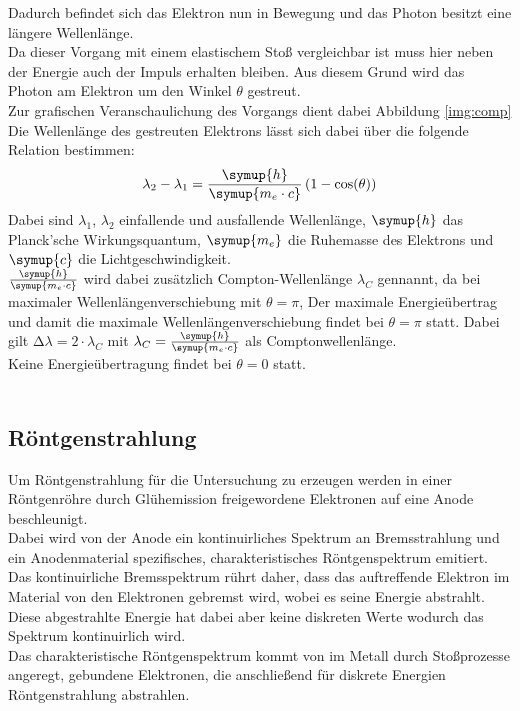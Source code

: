\noindent
Dadurch befindet sich das Elektron nun in Bewegung und das Photon besitzt eine längere Wellenlänge.\\
Da dieser Vorgang mit einem elastischem Stoß vergleichbar ist muss hier neben der Energie auch der Impuls erhalten bleiben.
Aus diesem Grund wird das Photon am Elektron um den Winkel $\theta$ gestreut.\\
Zur grafischen Veranschaulichung des Vorgangs dient dabei Abbildung \ref{img:comp}\\
Die Wellenlänge des gestreuten Elektrons lässt sich dabei über die folgende Relation bestimmen:
\begin{equation*}
    \lambda_2-\lambda_1=\frac{\symup{h}}{\symup{m_e\cdot c}}\left(1-\cos(\theta)\right)
\end{equation*}
Dabei sind $\lambda_1$, $\lambda_2$ einfallende und ausfallende Wellenlänge, ${\symup{h}}$ das Planck'sche Wirkungsquantum\cite{Planck},
$\symup{m_e}$ die Ruhemasse des Elektrons\cite{me} und $\symup{ c}$ die Lichtgeschwindigkeit\cite{c}.\\
$\frac{\symup{h}}{\symup{m_e\cdot c}}$ wird dabei zusätzlich Compton-Wellenlänge $\lambda_C$ gennannt, 
da bei maximaler Wellenlängenverschiebung mit $\theta=\pi$, 
Der maximale Energieübertrag und damit die maximale Wellenlängenverschiebung findet bei $\theta=\pi$ statt. 
Dabei gilt $\increment \lambda=2\cdot \lambda_C$ mit $\lambda_C=\frac{\symup{h}}{\symup{m_e\cdot c}}$ als Comptonwellenlänge.\\
Keine Energieübertragung findet bei $\theta=0$ statt.\\\\


\subsection{Röntgenstrahlung}

Um Röntgenstrahlung für die Untersuchung zu erzeugen werden in einer Röntgenröhre durch Glühemission freigewordene Elektronen auf eine Anode beschleunigt.\\
Dabei wird von der Anode ein kontinuirliches Spektrum an Bremsstrahlung und ein Anodenmaterial spezifisches, charakteristisches Röntgenspektrum emitiert.\\
Das kontinuirliche Bremsspektrum rührt daher, dass das auftreffende Elektron im Material von den Elektronen gebremst wird, wobei es seine Energie abstrahlt.
Diese abgestrahlte Energie hat dabei aber keine diskreten Werte wodurch das Spektrum kontinuirlich wird.\\
Das charakteristische Röntgenspektrum kommt von im Metall durch Stoßprozesse angeregt, gebundene Elektronen, die anschließend für diskrete Energien Röntgenstrahlung abstrahlen.\\\\


